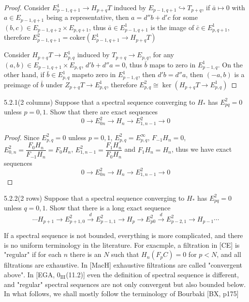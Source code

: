 \documentclass[../main.tex]{subfiles}
\begin{document}
\begin{proof}
Consider $E^1_{p-1,q+1}\to H_{p+q}T$ induced by $E_{p-1,q+1}\hookrightarrow T_{p+q}$, if $\bar a\mapsto0$ with $a\in E_{p-1,q+1}$ being a representative, then $a=d''b+d'c$ for some $(b,c)\in E_{p-1,q+2}\times E_{p,q+1}$, thus $\bar a\in E^1_{p-1,q+1}$ is the image of $\bar c\in E^1_{p,q+1}$, therefore $E^2_{p-1,q+1}=\mathrm{coker}(E^1_{p-1,q+1}\to H_{p+q}T)$ \par
Consider $H_{p+q}T\to E^1_{p,q}$ induced by $T_{p+q}\to E_{p,q}$, for any $(a,b)\in E_{p-1,q+1}\times E_{p,q}$, $d'b+d''a=0$, thus $\bar b$ maps to zero in $E^1_{p-1,q}$. On the other hand, if $\bar b\in E^1_{p,q}$ mapsto zero in $E^1_{p-1,q}$, then $d'b=d''a$, then $(-a,b)$ is a preimage of $\bar b$ under $Z_{p+q}T\to E^1_{p,q}$, therefore $E^2_{p,q}\cong\ker(H_{p+q}T\to E^1_{p,q})$
\end{proof}

\begin{customexercise}{5.2.1}(2 columns)
Suppose that a spectral sequence converging to $H_*$ has $E_{pq}^2=0$ unless $p=0,1$. Show that there are exact sequences
\[0\to E^2_{0n}\to H_n\to E^2_{1,n-1}\to0\]
\end{customexercise}

\begin{proof}
Since $E^2_{p,q}=0$ unless $p=0,1$, $E^2_{p,q}=E^\infty_{p,q}$, $F_{-1}H_n=0$, $E^2_{0,n}=\dfrac{F_{0}H_n}{F_{-1}H_n}=F_{0}H_n$, $E^2_{1,n-1}=\dfrac{F_{1}H_n}{F_{0}H_n}$ and $F_1H_n=H_n$, thus we have exact sequences
\[0\to E^2_{0n}\to H_n\to E^2_{1,n-1}\to0\]
\end{proof}

\begin{customexercise}{5.2.2}(2 rows)
Suppose that a spectral sequence converging to $H_*$ has $E_{pq}^2=0$ unless $q=0,1$. Show that there is a long exact sequence
\[\cdots H_{p+1}\to E^2_{p+1,0}\xrightarrow dE^2_{p-1,1}\to H_p\to E^2_{p0}\xrightarrow dE^2_{p-2,1}\to H_{p-1}\cdots\]
\end{customexercise}

\begin{remark}
If a spectral sequence is not bounded, everything is more complicated, and there is no uniform terminology in the literature. For exacmple, a filtration in [CE] is "regular" if for each $n$ there is an $N$ such that $H_n(F_pC)=0$ for $p<N$, and all filtrations are exhaustive. In [MacH] exhaustive filtrations are called "convergent above". In [EGA, $0_{\text{III}}$(11.2)] even the definition of spectral sequence is different, and "regular" spectral sequences are not only convergent but also bounded below. In what follows, we shall mostly follow the terminology of Bourbaki [BX, p175]
\end{remark}
\end{document}

